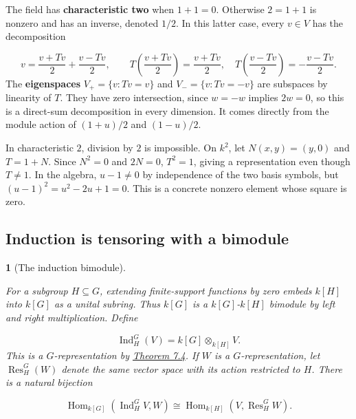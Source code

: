 \documentclass[11pt,a4paper]{article}
\newcommand{\mathheading}{}
\theoremstyle{plain}
\newtheorem*{plainstatement}{\mathheading}
\theoremstyle{definition}
\newenvironment{mathstatement}[3]{\renewcommand{\mathheading}{#1 #2}\begin{plainstatement}[#3]}{\end{plainstatement}}
\begin{document}
The field has \textbf{characteristic two} when \(1+1=0\). Otherwise \(2=1+1\) is nonzero and has an inverse, denoted \(1/2\). In this latter case, every \(v\in V\) has the decomposition

 \[v=\frac{v+Tv}{2}+\frac{v-Tv}{2},\qquad T\left(\frac{v+Tv}{2}\right)=\frac{v+Tv}{2},\quad T\left(\frac{v-Tv}{2}\right)=-\frac{v-Tv}{2}.\] 
The \textbf{eigenspaces} \(V_+=\{v:Tv=v\}\) and \(V_-=\{v:Tv=-v\}\) are subspaces by linearity of \(T\). They have zero intersection, since \(w=-w\) implies \(2w=0\), so this is a direct-sum decomposition in every dimension. It comes directly from the module action of \((1+u)/2\) and \((1-u)/2\).

 
In characteristic \(2\), division by \(2\) is impossible. On \(k^2\), let \(N(x,y)=(y,0)\) and \(T=1+N\). Since \(N^2=0\) and \(2N=0\), \(T^2=1\), giving a representation even though \(T\ne1\). In the algebra, \(u-1\ne0\) by independence of the two basis symbols, but \((u-1)^2=u^2-2u+1=0\). This is a concrete nonzero element whose square is zero.

 
\subsection{Induction is tensoring with a bimodule}
\label{induction}
 
\begin{mathstatement}{Proposition}{7.6}{The induction bimodule}
\label{env-7-6}

For a subgroup \(H\subseteq G\), extending finite-support functions by zero embeds \(k[H]\) into \(k[G]\) as a unital subring. Thus \(k[G]\) is a \(k[G]\)-\(k[H]\) bimodule by left and right multiplication. Define

 \[\operatorname{Ind}_H^G(V)=k[G]\otimes_{k[H]}V.\] 
This is a \(G\)-representation by \hyperref[env-7-4]{Theorem 7.4}. If \(W\) is a \(G\)-representation, let \(\operatorname{Res}_H^G(W)\) denote the same vector space with its action restricted to \(H\). There is a natural bijection

 \[\operatorname{Hom}_{k[G]}(\operatorname{Ind}_H^G V,W)\cong\operatorname{Hom}_{k[H]}(V,\operatorname{Res}_H^G W).\] 
\par{}\par

\end{mathstatement}
 
\end{document}
